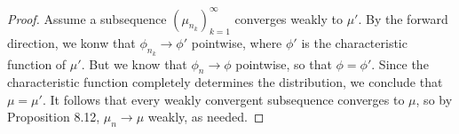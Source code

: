 \documentclass[stat901]{subfiles}
\begin{document}
\begin{proof}
        Assume a subsequence $\left( \mu_{n_k} \right)^{\infty}_{k=1}$ converges weakly to $\mu'$. By the forward direction, we konw that $\phi_{n_k}\to\phi'$ pointwise, where $\phi'$ is the characteristic function of $\mu'$. But we know that $\phi_n\to\phi$ pointwise, so that $\phi=\phi'$. Since the characteristic function completely determines the distribution, we conclude that $\mu=\mu'$. It follows that every weakly convergent subsequence converges to $\mu$, so by Proposition 8.12, $\mu_n\to\mu$ weakly, as needed.
    \end{proof}
\end{document}
